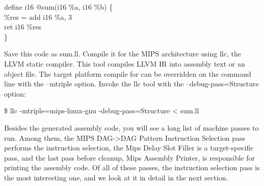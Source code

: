 \begin{tcolorbox}[colback=white,colframe=black]
define i16 @sum(i16 \%a, i16 \%b) \{ \\
\hspace*{0.5cm}\%res = add i16 \%a, 3 \\
\hspace*{0.5cm}ret i16 \%res \\
\}
\end{tcolorbox}

Save this code as sum.ll. Compile it for the MIPS architecture using llc, the LLVM static compiler. This tool compiles LLVM IR into assembly text or an object file. The target platform compile for can be overridden on the command line with the –mtriple option. Invoke the llc tool with the –debug-pass=Structure option:\par

\begin{tcolorbox}[colback=white,colframe=black]
\$ llc -mtriple=mips-linux-gnu -debug-pass=Structure < sum.ll
\end{tcolorbox}

Besides the generated assembly code, you will see a long list of machine passes to run. Among them, the MIPS DAG->DAG Pattern Instruction Selection pass performs the instruction selection, the Mips Delay Slot Filler is a target-specific pass, and the last pass before cleanup, Mips Assembly Printer, is responsible for printing the assembly code. Of all of these passes, the instruction selection pass is the most interesting one, and we look at it in detail in the next section.\par












